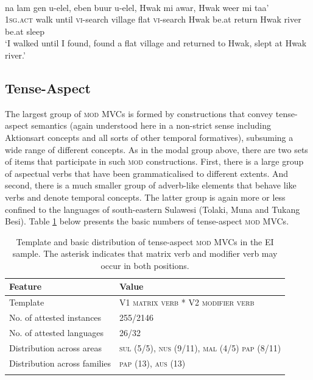 \ea \label{Klon_99b}
\\
\gll na lam gen u-elel, eben buur u-elel, Hwak mi awar, Hwak weer mi taa' \\
1\textsc{sg}.\textsc{act} walk until \textsc{vi}-search village flat \textsc{vi}-search Hwak be.at return Hwak river be.at sleep \\
\glft `I walked until I found, found a flat village and returned to Hwak, slept at Hwak river.'\\ 
\z

\subsection{Tense-Aspect}

The largest group of \textsc{mod} MVCs is formed by constructions that convey tense-aspect semantics (again understood here in a non-strict sense including Aktionsart concepts and all sorts of other temporal formatives), subsuming a wide range of different concepts. As in the modal group above, there are two sets of items that participate in such \textsc{mod} constructions. First, there is a large group of aspectual verbs that have been grammaticalised to different extents. And second, there is a much smaller group of adverb-like elements that behave like verbs and denote temporal concepts. The latter group is again more or less confined to the languages of south-eastern Sulawesi (Tolaki, Muna and Tukang Besi). Table \ref{table:tense-aspect} below presents the basic numbers of tense-aspect \textsc{mod} MVCs.

\begin{table}
\begin{tabular}{ll}
\lsptoprule
Feature&Value\tabularnewline
\hline
Template&V1 \textsc{matrix verb} * V2 \textsc{modifier verb}\tabularnewline
No. of attested instances& 255/2146 \tabularnewline
No. of attested languages& 26/32 \tabularnewline
Distribution across areas& \textsc{sul} (5/5), \textsc{nus} (9/11), \textsc{mal} (4/5) \textsc{pap} (8/11) \tabularnewline
Distribution across families& \textsc{pap} (13), \textsc{aus} (13) \tabularnewline
\lspbottomrule
\end{tabular}
\caption[Template and basic distribution of tense-aspect \textsc{mod} MVCs]{Template and basic distribution of tense-aspect \textsc{mod} MVCs in the EI sample. The asterisk indicates that matrix verb and modifier verb may occur in both positions.}
\label{table:tense-aspect}
\end{table}

